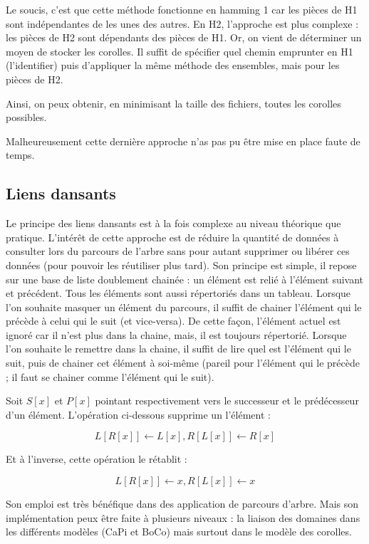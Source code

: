 	Le soucis, c'est que cette méthode fonctionne en hamming 1 car les pièces de H1 sont indépendantes de les unes des autres. En H2, l'approche est plus complexe : les pièces de H2 sont dépendants des pièces de H1. Or, on vient de déterminer un moyen de stocker les corolles. Il suffit de spécifier quel chemin emprunter en H1 (l'identifier) puis d'appliquer la même méthode des ensembles, mais pour les pièces de H2.
	
	Ainsi, on peux obtenir, en minimisant la taille des fichiers, toutes les corolles possibles.
	
	Malheureusement cette dernière approche n'as pas pu être mise en place faute de temps.
	
	\newpage
	
	\subsection{Liens dansants~\autocite{knuth2000dancing}}
	Le principe des liens dansants est à la fois complexe au niveau théorique que pratique. L'intérêt de cette approche est de réduire la quantité de données à consulter lors du parcours de l'arbre sans pour autant supprimer ou libérer ces données (pour pouvoir les réutiliser plus tard). Son principe est simple, il repose sur une base de liste doublement chainée : un élément est relié à l'élément suivant et précédent. Tous les éléments sont aussi répertoriés dans un tableau. Lorsque l'on souhaite masquer un élément du parcours, il suffit de chainer l'élément qui le précède à celui qui le suit (et vice-versa). De cette façon, l'élément actuel est ignoré car il n'est plus dans la chaine, mais, il est toujours répertorié. Lorsque l'on souhaite le remettre dans la chaine, il suffit de lire quel est l'élément qui le suit, puis de chainer cet élément à soi-même (pareil pour l'élément qui le précède ; il faut se chainer comme l'élément qui le suit).
	
	\begin{defn}
		Soit $S[x]$ et $P[x]$ pointant respectivement vers le successeur et le prédécesseur d'un élément. L'opération ci-dessous supprime un l'élément :
		
		\[
			L[R[x]] \leftarrow L[x], R[L[x]] \leftarrow R[x]
		\]
		
		Et à l'inverse, cette opération le rétablit :
		
		\[
			L[R[x]] \leftarrow x, R[L[x]] \leftarrow x
		\]
	\end{defn}
	
	Son emploi est très bénéfique dans des application de parcours d'arbre. Mais son implémentation peux être faite à plusieurs niveaux : la liaison des domaines dans les différents modèles (CaPi et BoCo) mais surtout dans le modèle des corolles.
	
